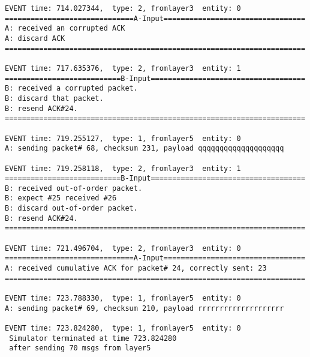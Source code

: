 \documentclass[12pt]{article}
\begin{document}
\begin{verbatim}
EVENT time: 714.027344,  type: 2, fromlayer3  entity: 0
==============================A-Input=================================
A: received an corrupted ACK 
A: discard ACK
======================================================================

EVENT time: 717.635376,  type: 2, fromlayer3  entity: 1
===========================B-Input====================================
B: received a corrupted packet.
B: discard that packet.
B: resend ACK#24.
======================================================================

EVENT time: 719.255127,  type: 1, fromlayer5  entity: 0
A: sending packet# 68, checksum 231, payload qqqqqqqqqqqqqqqqqqqq

EVENT time: 719.258118,  type: 2, fromlayer3  entity: 1
===========================B-Input====================================
B: received out-of-order packet.
B: expect #25 received #26
B: discard out-of-order packet.
B: resend ACK#24.
======================================================================

EVENT time: 721.496704,  type: 2, fromlayer3  entity: 0
==============================A-Input=================================
A: received cumulative ACK for packet# 24, correctly sent: 23
======================================================================

EVENT time: 723.788330,  type: 1, fromlayer5  entity: 0
A: sending packet# 69, checksum 210, payload rrrrrrrrrrrrrrrrrrrr

EVENT time: 723.824280,  type: 1, fromlayer5  entity: 0
 Simulator terminated at time 723.824280
 after sending 70 msgs from layer5
\end{verbatim}
\end{document}
